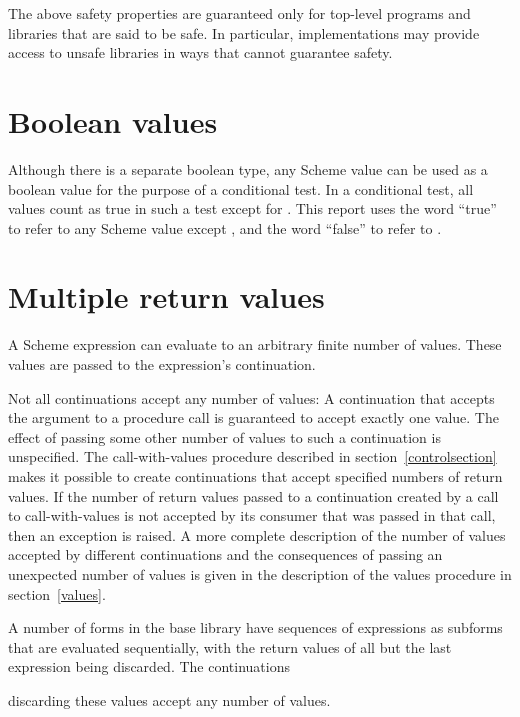 The above safety properties are guaranteed only for top-level programs
and libraries that are said to be safe.  In particular,
implementations may provide access to unsafe libraries in ways that
cannot guarantee safety.

\section{Boolean values}
\label{booleanvaluessection}

Although there is a separate boolean type, any Scheme value can be
used as a boolean value for the purpose of a conditional test.  In a
conditional test, all values count as true in such a test except for
\schfalse{}.  This report uses the word ``true'' to refer to any
Scheme value except \schfalse{}, and the word ``false'' to refer to
\schfalse{}.  

\section{Multiple return values}
\label{multiplereturnvaluessection}

A Scheme expression can evaluate to an arbitrary finite number of
values.  These values are passed to the expression's continuation.

Not all continuations accept any number of values: A continuation that
accepts the argument to a procedure call is guaranteed to accept
exactly one value.  The effect of passing some other number of values
to such a continuation is unspecified.  The {\cf call-with-values}
procedure
described in section~\ref{controlsection} makes it possible to create
continuations that accept specified numbers of return values.
If the number of
return values passed to a continuation created by a call to
{\cf call-with-values} is not accepted by its consumer
that was passed in that call, then an exception is raised.
A more complete description of the number of values accepted by
different continuations and the consequences of passing an unexpected
number of values is given in the description of the {\cf values}
procedure in section~\ref{values}.

A number of forms in the base library have sequences of expressions
as subforms that are evaluated sequentially, with the return values of
all but the last expression being discarded.  The continuations

discarding these values accept any number of values.

